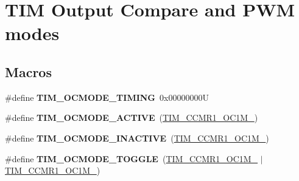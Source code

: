 \hypertarget{group___t_i_m___output___compare__and___p_w_m__modes}{}\section{T\+IM Output Compare and P\+WM modes}
\label{group___t_i_m___output___compare__and___p_w_m__modes}
\subsection*{Macros}
\begin{DoxyCompactItemize}
\item 
\mbox{\label{group___t_i_m___output___compare__and___p_w_m__modes_gafae6b98b4b854fbfffd9a5ebc59c8f61}} 
\#define {\bfseries T\+I\+M\+\_\+\+O\+C\+M\+O\+D\+E\+\_\+\+T\+I\+M\+I\+NG}~0x00000000U
\item 
\mbox{\label{group___t_i_m___output___compare__and___p_w_m__modes_ga111d1023e3ac6ef5544775c3863b4b12}} 
\#define {\bfseries T\+I\+M\+\_\+\+O\+C\+M\+O\+D\+E\+\_\+\+A\+C\+T\+I\+VE}~(\mbox{\hyperlink{group___peripheral___registers___bits___definition_ga410a4752a98081bad8ab3f72b28e7c5f}{T\+I\+M\+\_\+\+C\+C\+M\+R1\+\_\+\+O\+C1\+M\+\_}})
\item 
\mbox{\label{group___t_i_m___output___compare__and___p_w_m__modes_ga890fbb44fd16f2bce962983352d23f53}} 
\#define {\bfseries T\+I\+M\+\_\+\+O\+C\+M\+O\+D\+E\+\_\+\+I\+N\+A\+C\+T\+I\+VE}~(\mbox{\hyperlink{group___peripheral___registers___bits___definition_ga8b5f6ec25063483641d6dc065d96d2b5}{T\+I\+M\+\_\+\+C\+C\+M\+R1\+\_\+\+O\+C1\+M\+\_}})
\item 
\mbox{\label{group___t_i_m___output___compare__and___p_w_m__modes_ga368f80fad76018e2bf76084522e47536}} 
\#define {\bfseries T\+I\+M\+\_\+\+O\+C\+M\+O\+D\+E\+\_\+\+T\+O\+G\+G\+LE}~(\mbox{\hyperlink{group___peripheral___registers___bits___definition_ga410a4752a98081bad8ab3f72b28e7c5f}{T\+I\+M\+\_\+\+C\+C\+M\+R1\+\_\+\+O\+C1\+M\+\_}} $\vert$ \mbox{\hyperlink{group___peripheral___registers___bits___definition_ga8b5f6ec25063483641d6dc065d96d2b5}{T\+I\+M\+\_\+\+C\+C\+M\+R1\+\_\+\+O\+C1\+M\+\_}})

\end{DoxyCompactItemize}
